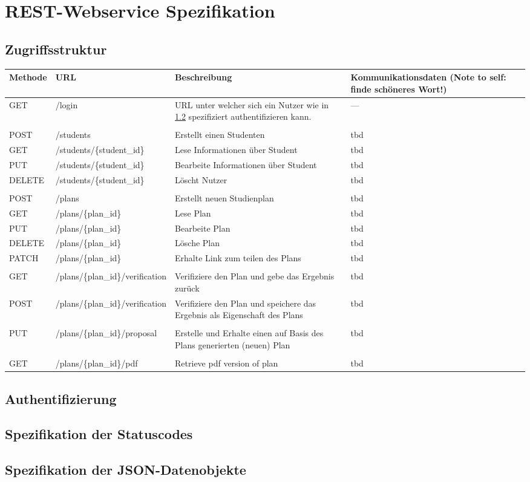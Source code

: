 \section{REST-Webservice Spezifikation}

\subsection{Zugriffsstruktur}

\begin{longtable}{| l | l | p{3cm} | p{3cm} |}
	\hline
	\textbf{Methode} & \textbf{URL} & \textbf{Beschreibung} & \textbf{Kommunikationsdaten (Note to self: finde schöneres Wort!)} \\ \hline \hline
	GET & /login & URL unter welcher sich ein Nutzer wie in \ref{subsec:api-auth} spezifiziert authentifizieren kann. & --- \\
	\hline
	& & & \\ \hline
	POST & /students & Erstellt einen Studenten & tbd
	\\ \hline
	GET & /students/\{student\_id\} & Lese Informationen über Student & tbd
	\\ \hline
	PUT & /students/\{student\_id\} & Bearbeite Informationen über Student & tbd
	\\ \hline
	DELETE & /students/\{student\_id\} & Löscht Nutzer & tbd \\ \hline
	& & & \\ \hline
	POST & /plans & Erstellt neuen Studienplan & tbd \\ \hline
	GET & /plans/\{plan\_id\} & Lese Plan & tbd \\ \hline
	PUT & /plans/\{plan\_id\} & Bearbeite Plan & tbd \\ \hline
	DELETE & /plans/\{plan\_id\} & Lösche Plan & tbd \\ \hline
	PATCH & /plans/\{plan\_id\} & Erhalte Link zum teilen des Plans & tbd \\ \hline
	& & & \\ \hline
	GET & /plans/\{plan\_id\}/verification & Verifiziere den Plan und gebe das Ergebnis zurück & tbd \\ \hline
	POST & /plans/\{plan\_id\}/verification & Verifiziere den Plan und speichere das Ergebnis als Eigenschaft des Plans & tbd \\ \hline
	& & & \\ \hline
	PUT & /plans/\{plan\_id\}/proposal & Erstelle und Erhalte einen auf Basis des Plans generierten (neuen) Plan & tbd \\ \hline
	& & & \\ \hline
	GET & /plans/\{plan\_id\}/pdf & Retrieve pdf version of plan & tbd \\ \hline
	\hline
\end{longtable}

\subsection{Authentifizierung}
\label{subsec:api-auth}
\subsection{Spezifikation der Statuscodes}

\subsection{Spezifikation der JSON-Datenobjekte}
